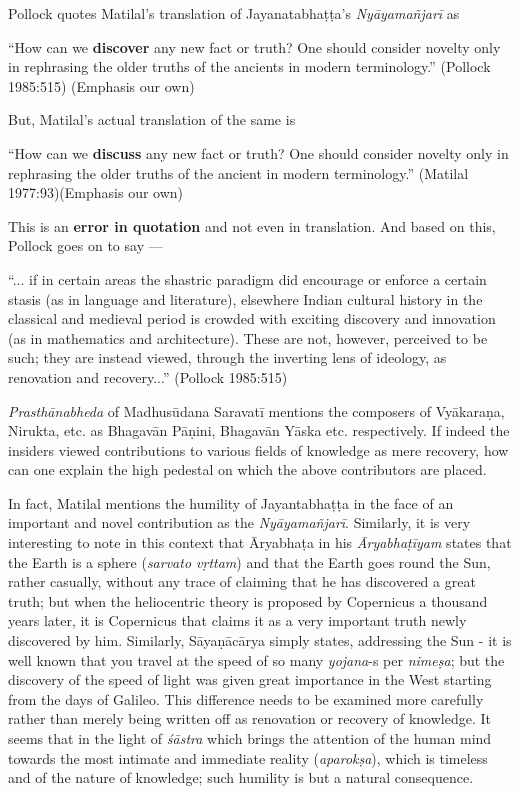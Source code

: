 Pollock quotes Matilal's translation of Jayanatabhaṭṭa's   {\sl Nyāyamañjarī} as
\begin{myquote}
``How can we {\bf discover} any new fact or truth? One should consider novelty only in rephrasing the older truths of the ancients in modern terminology.'' (Pollock 1985:515) (Emphasis our own)
\end{myquote}

But, Matilal's actual translation of the same is

\newpage

\begin{myquote}
``How can we {\bf discuss} any new fact or truth? One should consider novelty only in rephrasing the older truths of the ancient in modern terminology.'' (Matilal 1977:93)(Emphasis our own)
\end{myquote}

This is an {\bf error in quotation} and not even in translation. And based on this, Pollock goes on to say ---
\begin{myquote}
``... if in certain areas the shastric paradigm did encourage or enforce a certain stasis (as in language and literature), elsewhere Indian cultural history in the classical and medieval period is crowded with exciting discovery and innovation (as in mathematics and architecture). These are not, however, perceived to be such; they are instead viewed, through the inverting lens of ideology, as renovation and recovery...'' (Pollock 1985:515)
\end{myquote}

{\sl Prasthānabheda} of Madhusūdana Saravatī mentions the composers of Vyākaraṇa, Nirukta, etc. as Bhagavān Pāṇini, Bhagavān Yāska etc. respectively. If indeed the insiders viewed contributions to various ﬁelds of knowledge as mere recovery, how can one explain the high pedestal on which the above contributors are placed. 

In fact, Matilal mentions the humility of Jayantabhaṭṭa in the face of an important and novel contribution as the {\sl Nyāyamañjarī}. Similarly, it is very interesting to note in this context that Āryabhaṭa in his  {\sl Āryabhaṭīyam} states that the Earth is a sphere ({\sl sarvato vṛttam}) and that the Earth goes round the Sun, rather casually, without any trace of claiming that he has discovered a great truth; but when the heliocentric theory is proposed by Copernicus a thousand years later, it is Copernicus that claims it as a very important truth newly discovered by him. Similarly, Sāyaṇācārya simply states, addressing the Sun - it is well known that you travel at the speed of so many {\sl yojana}-s per {\sl nimeṣa}; but the discovery of  the speed of light was given great importance in the West starting from the days of Galileo. This difference needs to be examined more carefully rather than merely being written off as renovation or recovery of knowledge. It seems that in the light of {\sl śāstra} which brings the attention of the human mind towards the most intimate and immediate reality ({\sl aparokṣa}), which is timeless and of the nature of knowledge; such humility is but a natural consequence.

